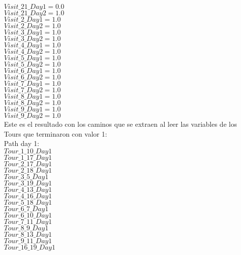 $Visit\_21\_Day1 = 0.0$\\
$Visit\_21\_Day2 = 1.0$\\
$Visit\_2\_Day1 = 1.0$\\
$Visit\_2\_Day2 = 1.0$\\
$Visit\_3\_Day1 = 1.0$\\
$Visit\_3\_Day2 = 1.0$\\
$Visit\_4\_Day1 = 1.0$\\
$Visit\_4\_Day2 = 1.0$\\
$Visit\_5\_Day1 = 1.0$\\
$Visit\_5\_Day2 = 1.0$\\
$Visit\_6\_Day1 = 1.0$\\
$Visit\_6\_Day2 = 1.0$\\
$Visit\_7\_Day1 = 1.0$\\
$Visit\_7\_Day2 = 1.0$\\
$Visit\_8\_Day1 = 1.0$\\
$Visit\_8\_Day2 = 1.0$\\
$Visit\_9\_Day1 = 1.0$\\
$Visit\_9\_Day2 = 1.0$\\

Este es el resultado con los caminos que se extraen al leer las variables de los Tours que terminaron con valor 1: \\

Path day 1:\\
$Tour\_1\_10\_Day1$\\
$Tour\_1\_17\_Day1$\\
$Tour\_2\_17\_Day1$\\
$Tour\_2\_18\_Day1$\\
$Tour\_3\_5\_Day1$\\
$Tour\_3\_19\_Day1$\\
$Tour\_4\_13\_Day1$\\
$Tour\_4\_16\_Day1$\\
$Tour\_5\_18\_Day1$\\
$Tour\_6\_7\_Day1$\\
$Tour\_6\_10\_Day1$\\
$Tour\_7\_11\_Day1$\\
$Tour\_8\_9\_Day1$\\
$Tour\_8\_13\_Day1$\\
$Tour\_9\_11\_Day1$\\
$Tour\_16\_19\_Day1$ \\

